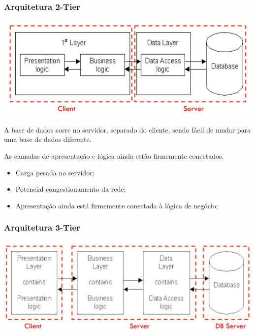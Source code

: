 \documentclass{article}
\begin{document}
\subsubsection{Arquitetura 2-Tier}

\begin{center}
  \includegraphics[scale=0.4]{4}
\end{center}

\begin{flushleft}
  A base de dados corre no servidor, separado do cliente, sendo fácil de
  mudar para uma base de dados diferente.

  As camadas de apresentação e lógica ainda estão firmemente conectados.
  \begin{itemize}
    \item Carga pesada no servidor;
    \item Potencial congestionamento da rede;
    \item Apresentação ainda está firmemente conectada à lógica de negócio;
  \end{itemize}
\end{flushleft}

\subsubsection{Arquitetura 3-Tier}

\begin{center}
  \includegraphics[scale=0.4]{5}
\end{center}
\end{document}
